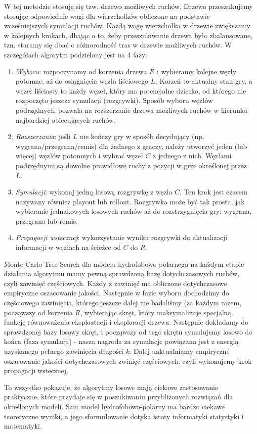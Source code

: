 \documentclass[leqno,10pt]{article}
\begin{document}
W tej metodzie stosuję się tzw. drzewo możliwych ruchów. Drzewo przeszukujemy stosując odpowiednie wagi dla wierzchołków obliczone na podstawie wcześniejszych symulacji ruchów. Każdą wagę wierzchołka w drzewie zwiększamy w kolejnych krokach, dbając o to, żeby przeszukiwanie drzewa było zbalansowane, tzn. staramy się dbać o różnorodność tras w drzewie możliwych ruchów. W szczegółach algorytm podzielony jest na 4 fazy: 
\begin{enumerate}
\item \textit{Wyboru}: rozpoczynamy od korzenia drzewa $R$ i wybieramy kolejne węzły potomne, aż do osiągnięcia węzła liściowego $L$. Korzeń to aktualny stan gry, a węzeł liściasty to każdy węzeł, który ma potencjalne dziecko, od którego nie rozpoczęto jeszcze symulacji (rozgrywki). Sposób wyboru węzłów podrzędnych, pozwala na rozszerzanie drzewa możliwych ruchów w kierunku najbardziej obiecujących ruchów,
\item \textit{Rozszerzania}: jeśli $L$ nie kończy gry w sposób decydujący (np. wygrana/przegrana/remis) dla żadnego z graczy, należy utworzyć jeden (lub więcej) węzłów potomnych i wybrać węzeł $C$ z jednego z nich. Węzłami podrzędnymi są dowolne prawidłowe ruchy z pozycji w grze określonej przez $L$.
\item  \textit{Symulacji}: wykonaj jedną losową rozgrywkę z węzła $C$. Ten krok jest czasem nazywany również playout lub rollout. Rozgrywka może być tak prosta, jak wybieranie jednakowych losowych ruchów aż do rozstrzygnięcia gry: wygrana, przegrana lub remis.
\item \textit{Propagacji wstecznej}: wykorzystanie wyniku rozgrywki do aktualizacji informacji w węzłach na ścieżce od $C$ do $R$.
\end{enumerate}
Monte Carlo Tree Search dla modelu hydrofobowo-polarnego na każdym etapie działania algorytmu mamy pewną sprawdzoną bazę dotychczasowych ruchów, czyli zawinięć częściowych. Każdy z zawinięć ma obliczone dotychczasowe empiryczne oszacowanie jakości. Następnie w fazie wyboru dochodzimy do częściowego zawinięcia, którego jeszcze dalej nie badaliśmy (za każdym razem, począwszy od korzenia $R$, wybierając skręt, który maksymalizuje specjalną funkcję równoważenia eksploatacji i eksploracji drzewa. Następnie dokładamy do sprawdzonej bazy losowy skręt, i począwszy od tego skrętu symulujemy losowo do końca (faza symulacji) - nasza nagroda za symulacje powiązana jest z energią uzyskanego pełnego zawinięcia długości $k$. Dalej uaktualniamy empiryczne oszacowanie jakości dotychczasowych zwinięć częściowych, czyli wykonujemy krok propagacji wstecznej. 

To wszystko pokazuje, że algorytmy losowe mają ciekawe zastosowanie praktyczne, które przydaje się w poszukiwaniu przybliżonych rozwiązań dla określonych modeli. Sam model hydrofobowo-polarny ma bardzo ciekawe teoretyczne wyniki, a jego sformułowanie dotyka istoty informatyki statystyki i matematyki.  
\end{document}
